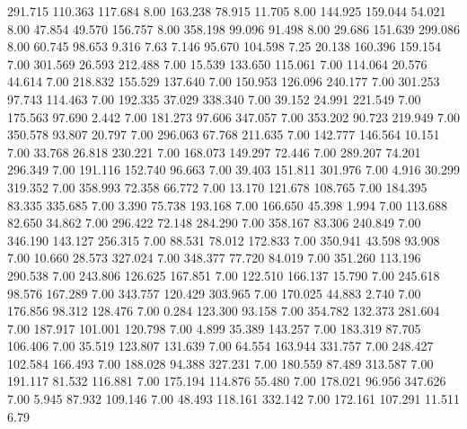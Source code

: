  291.715  110.363  117.684         8.00
 163.238   78.915   11.705         8.00
 144.925  159.044   54.021         8.00
  47.854   49.570  156.757         8.00
 358.198   99.096   91.498         8.00
  29.686  151.639  299.086         8.00
  60.745   98.653    9.316         7.63
   7.146   95.670  104.598         7.25
  20.138  160.396  159.154         7.00
 301.569   26.593  212.488         7.00
  15.539  133.650  115.061         7.00
 114.064   20.576   44.614         7.00
 218.832  155.529  137.640         7.00
 150.953  126.096  240.177         7.00
 301.253   97.743  114.463         7.00
 192.335   37.029  338.340         7.00
  39.152   24.991  221.549         7.00
 175.563   97.690    2.442         7.00
 181.273   97.606  347.057         7.00
 353.202   90.723  219.949         7.00
 350.578   93.807   20.797         7.00
 296.063   67.768  211.635         7.00
 142.777  146.564   10.151         7.00
  33.768   26.818  230.221         7.00
 168.073  149.297   72.446         7.00
 289.207   74.201  296.349         7.00
 191.116  152.740   96.663         7.00
  39.403  151.811  301.976         7.00
   4.916   30.299  319.352         7.00
 358.993   72.358   66.772         7.00
  13.170  121.678  108.765         7.00
 184.395   83.335  335.685         7.00
   3.390   75.738  193.168         7.00
 166.650   45.398    1.994         7.00
 113.688   82.650   34.862         7.00
 296.422   72.148  284.290         7.00
 358.167   83.306  240.849         7.00
 346.190  143.127  256.315         7.00
  88.531   78.012  172.833         7.00
 350.941   43.598   93.908         7.00
  10.660   28.573  327.024         7.00
 348.377   77.720   84.019         7.00
 351.260  113.196  290.538         7.00
 243.806  126.625  167.851         7.00
 122.510  166.137   15.790         7.00
 245.618   98.576  167.289         7.00
 343.757  120.429  303.965         7.00
 170.025   44.883    2.740         7.00
 176.856   98.312  128.476         7.00
   0.284  123.300   93.158         7.00
 354.782  132.373  281.604         7.00
 187.917  101.001  120.798         7.00
   4.899   35.389  143.257         7.00
 183.319   87.705  106.406         7.00
  35.519  123.807  131.639         7.00
  64.554  163.944  331.757         7.00
 248.427  102.584  166.493         7.00
 188.028   94.388  327.231         7.00
 180.559   87.489  313.587         7.00
 191.117   81.532  116.881         7.00
 175.194  114.876   55.480         7.00
 178.021   96.956  347.626         7.00
   5.945   87.932  109.146         7.00
  48.493  118.161  332.142         7.00
 172.161  107.291   11.511         6.79
